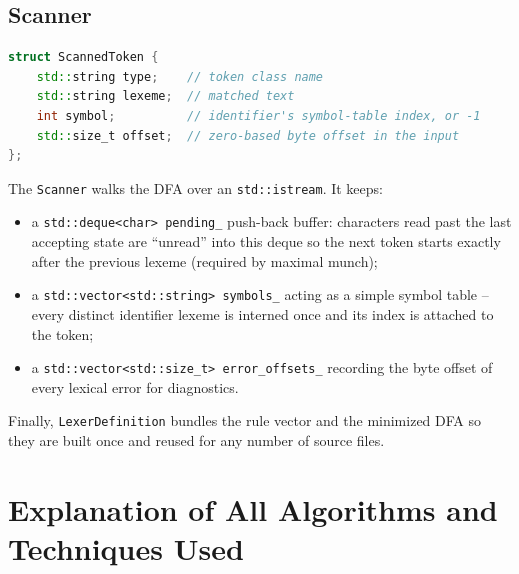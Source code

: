 \documentclass[11pt,a4paper]{article}
\begin{document}
\subsection{Scanner}
\begin{lstlisting}[basicstyle=\ttfamily\small,language=C++]
struct ScannedToken {
    std::string type;    // token class name
    std::string lexeme;  // matched text
    int symbol;          // identifier's symbol-table index, or -1
    std::size_t offset;  // zero-based byte offset in the input
};
\end{lstlisting}
The \texttt{Scanner} walks the DFA over an \texttt{std::istream}. It keeps:
\begin{itemize}
    \item a \texttt{std::deque<char> pending\_} push-back buffer: characters read
          past the last accepting state are ``unread'' into this deque so the
          next token starts exactly after the previous lexeme (required by
          maximal munch);
    \item a \texttt{std::vector<std::string> symbols\_} acting as a simple symbol
          table -- every distinct identifier lexeme is interned once and its
          index is attached to the token;
    \item a \texttt{std::vector<std::size\_t> error\_offsets\_} recording the byte
          offset of every lexical error for diagnostics.
\end{itemize}
Finally, \texttt{LexerDefinition} bundles the rule vector and the minimized DFA
so they are built once and reused for any number of source files.

\section{Explanation of All Algorithms and Techniques Used}
\end{document}
